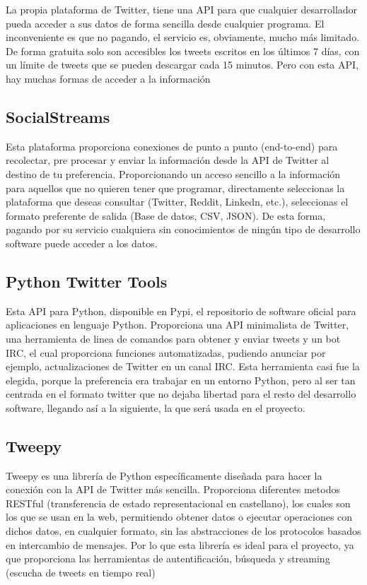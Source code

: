 La propia plataforma de Twitter, tiene una API para que cualquier desarrollador pueda acceder a sus datos de forma sencilla desde cualquier programa. El inconveniente es que no pagando, el servicio es, obviamente, mucho más limitado. De forma gratuita solo son accesibles los tweets escritos en los últimos 7 días, con un límite de tweets que se pueden descargar cada 15 minutos. Pero con esta API, hay muchas formas de acceder a la información

\subsection{SocialStreams} 
Esta plataforma proporciona conexiones de punto a punto (end-to-end) para recolectar, pre procesar y enviar la información desde la API de Twitter al destino de tu preferencia. Proporcionando un acceso sencillo a la información para aquellos que no quieren tener que programar, directamente seleccionas la plataforma que deseas consultar (Twitter, Reddit, Linkedn, etc.), seleccionas el formato preferente de salida (Base de datos, CSV, JSON). De esta forma, pagando por su servicio cualquiera sin conocimientos de ningún tipo de desarrollo software puede acceder a los datos. 

\subsection{Python Twitter Tools}

Esta API para Python, disponible en Pypi, el repositorio de software oficial para aplicaciones en lenguaje Python. Proporciona una API minimalista de Twitter, una herramienta de linea de comandos para obtener y enviar tweets y un bot IRC, el cual proporciona funciones automatizadas, pudiendo anunciar por ejemplo, actualizaciones de Twitter en un canal IRC. Esta herramienta casi fue la elegida, porque la preferencia era trabajar en un entorno Python, pero al ser tan centrada en el formato twitter que no dejaba libertad para el resto del desarrollo software, llegando así a la siguiente, la que será usada en el proyecto. 

\subsection{Tweepy}

Tweepy es una librería de Python específicamente diseñada para hacer la conexión con la API de Twitter más sencilla. Proporciona diferentes metodos RESTful (transferencia de estado representacional en castellano), los cuales son los que se usan en la web, permitiendo obtener datos o ejecutar operaciones con dichos datos, en cualquier formato, sin las abstracciones de los protocolos basados en intercambio de mensajes. Por lo que esta librería es ideal para el proyecto, ya que proporciona las herramientas de autentificación, búsqueda y streaming (escucha de tweets en tiempo real)

